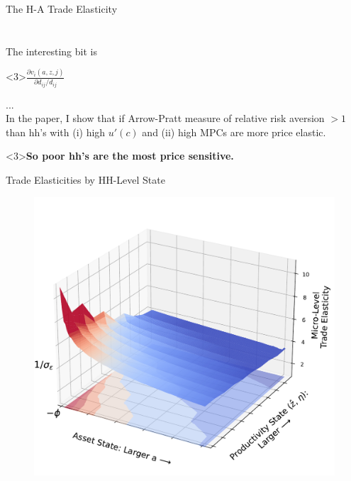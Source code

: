 \documentclass[9pt,pdftex,aspectratio=1610]{beamer}
\theoremstyle{definition}
\begin{document}
\begin{frame}[t]{The H-A Trade Elasticity}
{{\begin{align*}
\end{align*}}\\
\medskip
The interesting bit is \begin{alert}<3>{$\frac{\partial v_{i}(a,z,j)}{\partial d_{ij}/d_{ij}}$}\end{alert} ...\\
\medskip
In the paper, I show that if Arrow-Pratt measure of relative risk aversion $ > 1$ than hh's with (i) high $u'(c)$ and (ii) high MPCs are more price elastic. \begin{alert}<3>{\textbf{So poor hh's are the most price sensitive.}}\end{alert}}
\end{frame}






%



\begin{frame}[t]{Trade Elasticities by HH-Level State}
\vspace{-.5cm}
\begin{figure}[t]
\centerline{
\includegraphics[scale = 0.5]{../notes/figures/micro-elasticity.pdf}}
\end{figure}
\end{frame}
\end{document}
